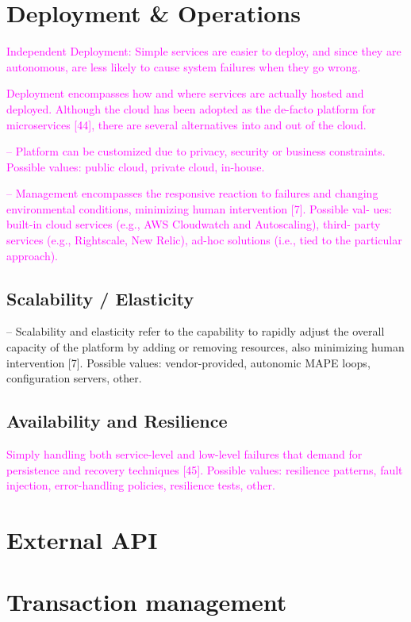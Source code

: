 \documentclass[thesis=M,english,hidelinks]{FITthesis}[2012/10/20]
\begin{document}
\section{Deployment \& Operations}
\textcolor{magenta}{Independent Deployment: Simple services are easier to deploy, and since they are autonomous, are less likely to cause system failures when they go wrong.}

\textcolor{magenta}{Deployment encompasses how and where services are actually hosted and deployed. Although the cloud has been adopted as the de-facto platform for microservices [44], there are several alternatives into and out of the cloud.}

\textcolor{magenta}{– Platform can be customized due to privacy, security or business constraints. Possible values: public cloud, private cloud, in-house.}

\textcolor{magenta}{– Management encompasses the responsive reaction to failures and changing environmental conditions, minimizing human intervention [7]. Possible val- ues: built-in cloud services (e.g., AWS Cloudwatch and Autoscaling), third- party services (e.g., Rightscale, New Relic), ad-hoc solutions (i.e., tied to the particular approach).}

\subsection{Scalability / Elasticity}
\label{sec:scalability}
– Scalability and elasticity refer to the capability to rapidly adjust the overall capacity of the platform by adding or removing resources, also minimizing human intervention [7]. Possible values: vendor-provided, autonomic MAPE loops, configuration servers, other.
\subsection{Availability and Resilience}
\textcolor{magenta}{Simply handling both service-level and low-level failures that demand for persistence and recovery techniques [45]. Possible values: resilience patterns, fault injection, error-handling policies, resilience tests, other.}
% 
% 
\section{External API}
\label{sec:ext_api}


\section{Transaction management}
\end{document}

